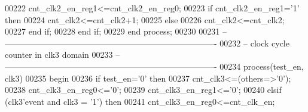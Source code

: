 \begin{DoxyCode}
00222             \textcolor{vhdlchar}{cnt_clk2_en_reg1}\textcolor{vhdlchar}{<=}\textcolor{vhdlchar}{cnt_clk2_en_reg0};
00223           \textcolor{keywordflow}{if} \textcolor{vhdlchar}{cnt_clk2_en_reg1}\textcolor{vhdlchar}{=}\textcolor{vhdlchar}{'}\textcolor{vhdllogic}{}\textcolor{vhdllogic}{1}\textcolor{vhdlchar}{'} \textcolor{keywordflow}{then} 
00224                 \textcolor{vhdlchar}{cnt_clk2}\textcolor{vhdlchar}{<=}\textcolor{vhdlchar}{cnt_clk2}\textcolor{vhdlchar}{+}\textcolor{vhdllogic}{}\textcolor{vhdllogic}{1};
00225             \textcolor{keywordflow}{else} 
00226                 \textcolor{vhdlchar}{cnt_clk2}\textcolor{vhdlchar}{<=}\textcolor{vhdlchar}{cnt_clk2};
00227             \textcolor{keywordflow}{end} \textcolor{keywordflow}{if};
00228         \textcolor{keywordflow}{end} \textcolor{keywordflow}{if};
00229     \textcolor{keywordflow}{end} \textcolor{keywordflow}{process};
00230 
00231 \textcolor{keyword}{-- ----------------------------------------------------------------------------}
00232 \textcolor{keyword}{-- clock cycle counter in clk3 domain}
00233 \textcolor{keyword}{-- ----------------------------------------------------------------------------}
00234   \textcolor{keywordflow}{process}(test_en, clk3)
00235 \textcolor{vhdlkeyword}{    begin}
00236       \textcolor{keywordflow}{if} \textcolor{vhdlchar}{test_en}\textcolor{vhdlchar}{=}\textcolor{vhdlchar}{'}\textcolor{vhdllogic}{}\textcolor{vhdllogic}{0}\textcolor{vhdlchar}{'} \textcolor{keywordflow}{then}
00237             \textcolor{vhdlchar}{cnt_clk3}\textcolor{vhdlchar}{<=}\textcolor{vhdlchar}{(}\textcolor{keywordflow}{others}\textcolor{vhdlchar}{=}\textcolor{vhdlchar}{>}\textcolor{vhdlchar}{'}\textcolor{vhdllogic}{}\textcolor{vhdllogic}{0}\textcolor{vhdlchar}{'}\textcolor{vhdlchar}{)}; 
00238             \textcolor{vhdlchar}{cnt_clk3_en_reg0}\textcolor{vhdlchar}{<=}\textcolor{vhdlchar}{'}\textcolor{vhdllogic}{}\textcolor{vhdllogic}{0}\textcolor{vhdlchar}{'};
00239             \textcolor{vhdlchar}{cnt_clk3_en_reg1}\textcolor{vhdlchar}{<=}\textcolor{vhdlchar}{'}\textcolor{vhdllogic}{}\textcolor{vhdllogic}{0}\textcolor{vhdlchar}{'};
00240         \textcolor{keywordflow}{elsif} \textcolor{vhdlchar}{(}\textcolor{vhdlchar}{clk3}\textcolor{vhdlchar}{'}\textcolor{vhdlkeyword}{event} \textcolor{keywordflow}{and} \textcolor{vhdlchar}{clk3} \textcolor{vhdlchar}{=} \textcolor{vhdlchar}{'}\textcolor{vhdllogic}{}\textcolor{vhdllogic}{1}\textcolor{vhdlchar}{'}\textcolor{vhdlchar}{)} \textcolor{keywordflow}{then}
00241             \textcolor{vhdlchar}{cnt_clk3_en_reg0}\textcolor{vhdlchar}{<=}\textcolor{vhdlchar}{cnt_clk_en};

\end{DoxyCode}
